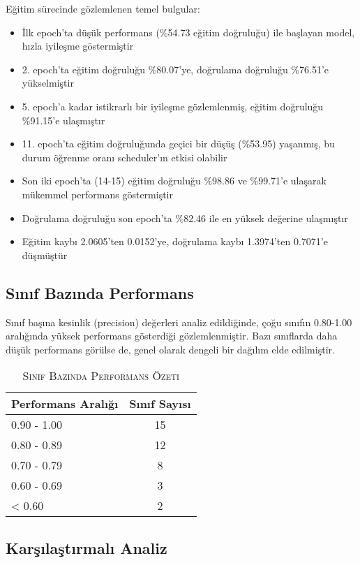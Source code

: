 \documentclass[conference, a4paper]{IEEEtran}
\begin{document}
	Eğitim sürecinde gözlemlenen temel bulgular:
	\begin{itemize}
		\item İlk epoch'ta düşük performans (\%54.73 eğitim doğruluğu) ile başlayan model, hızla iyileşme göstermiştir
		\item 2. epoch'ta eğitim doğruluğu \%80.07'ye, doğrulama doğruluğu \%76.51'e yükselmiştir
		\item 5. epoch'a kadar istikrarlı bir iyileşme gözlemlenmiş, eğitim doğruluğu \%91.15'e ulaşmıştır
		\item 11. epoch'ta eğitim doğruluğunda geçici bir düşüş (\%53.95) yaşanmış, bu durum öğrenme oranı scheduler'ın etkisi olabilir
		\item Son iki epoch'ta (14-15) eğitim doğruluğu \%98.86 ve \%99.71'e ulaşarak mükemmel performans göstermiştir
		\item Doğrulama doğruluğu son epoch'ta \%82.46 ile en yüksek değerine ulaşmıştır
		\item Eğitim kaybı 2.0605'ten 0.0152'ye, doğrulama kaybı 1.3974'ten 0.7071'e düşmüştür
	\end{itemize}
	
	\subsection{Sınıf Bazında Performans}
	
	Sınıf başına kesinlik (precision) değerleri analiz edildiğinde, çoğu sınıfın 0.80-1.00 aralığında yüksek performans gösterdiği gözlemlenmiştir. Bazı sınıflarda daha düşük performans görülse de, genel olarak dengeli bir dağılım elde edilmiştir.
	
	\begin{table}[h]
		\centering
		\caption{\textsc{Sınıf Bazında Performans Özeti}}
		\label{tablo_class_summary}
		\begin{tabular}{|l|c|}
			\hline
			\textbf{Performans Aralığı} & \textbf{Sınıf Sayısı} \\
			\hline
			0.90 - 1.00 & 15 \\
			\hline
			0.80 - 0.89 & 12 \\
			\hline
			0.70 - 0.79 & 8 \\
			\hline
			0.60 - 0.69 & 3 \\
			\hline
			< 0.60 & 2 \\
			\hline
		\end{tabular}
	\end{table}
	
	\subsection{Karşılaştırmalı Analiz}
	
\end{document}
